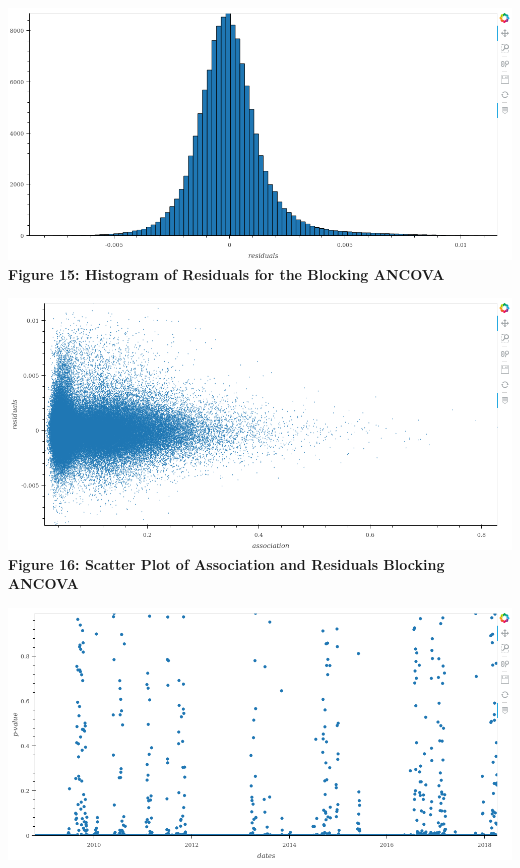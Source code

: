 \documentclass[11pt]{article}
\makeatletter
\def\maxwidth{\ifdim\Gin@nat@width>\linewidth\linewidth
    \else\Gin@nat@width\fi}
\let\Oldincludegraphics\includegraphics
\renewcommand{\includegraphics}[1]{\Oldincludegraphics[width=.8\maxwidth]{#1}}
\makeatother
\begin{document}
\includegraphics{../experiments/media/Histogram of Residuals of Blocking Ancova.png}\\

\textbf{Figure 15: Histogram of Residuals for the Blocking ANCOVA}

\includegraphics{../experiments/media/Scatter Plot of Residuals of Blocking Ancova.png}\\

\textbf{Figure 16: Scatter Plot of Association and Residuals Blocking
ANCOVA }

\includegraphics{../experiments/media/Scatter Plot of P-values for dates of Blocking Ancova.png}\\
\end{document}
